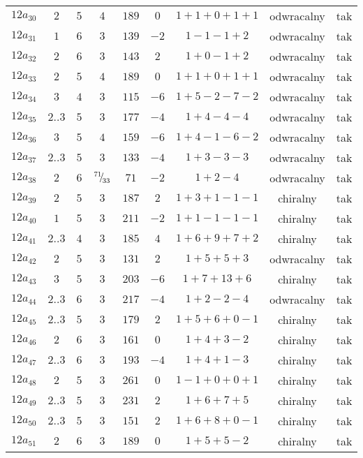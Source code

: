 \begin{longtable}{ccccccccc}
$12a_{30}$ & $2$ & $5$ & $4$ & $189$ & $0$ & $1+1+0+1+1$ & odwracalny & tak \\
$12a_{31}$ & $1$ & $6$ & $3$ & $139$ & $-2$ & $1-1-1+2$ & odwracalny & tak \\
$12a_{32}$ & $2$ & $6$ & $3$ & $143$ & $2$ & $1+0-1+2$ & odwracalny & tak \\
$12a_{33}$ & $2$ & $5$ & $4$ & $189$ & $0$ & $1+1+0+1+1$ & odwracalny & tak \\
$12a_{34}$ & $3$ & $4$ & $3$ & $115$ & $-6$ & $1+5-2-7-2$ & odwracalny & tak \\
$12a_{35}$ & $2..3$ & $5$ & $3$ & $177$ & $-4$ & $1+4-4-4$ & odwracalny & tak \\
$12a_{36}$ & $3$ & $5$ & $4$ & $159$ & $-6$ & $1+4-1-6-2$ & odwracalny & tak \\
$12a_{37}$ & $2..3$ & $5$ & $3$ & $133$ & $-4$ & $1+3-3-3$ & odwracalny & tak \\
$12a_{38}$ & $2$ & $6$ & ${}^{71}{\mskip -5mu/\mskip -3mu}_{33}$ & $71$ & $-2$ & $1+2-4$ & odwracalny & tak \\
$12a_{39}$ & $2$ & $5$ & $3$ & $187$ & $2$ & $1+3+1-1-1$ & chiralny & tak \\
$12a_{40}$ & $1$ & $5$ & $3$ & $211$ & $-2$ & $1+1-1-1-1$ & chiralny & tak \\
$12a_{41}$ & $2..3$ & $4$ & $3$ & $185$ & $4$ & $1+6+9+7+2$ & chiralny & tak \\
$12a_{42}$ & $2$ & $5$ & $3$ & $131$ & $2$ & $1+5+5+3$ & odwracalny & tak \\
$12a_{43}$ & $3$ & $5$ & $3$ & $203$ & $-6$ & $1+7+13+6$ & chiralny & tak \\
$12a_{44}$ & $2..3$ & $6$ & $3$ & $217$ & $-4$ & $1+2-2-4$ & odwracalny & tak \\
$12a_{45}$ & $2..3$ & $5$ & $3$ & $179$ & $2$ & $1+5+6+0-1$ & chiralny & tak \\
$12a_{46}$ & $2$ & $6$ & $3$ & $161$ & $0$ & $1+4+3-2$ & chiralny & tak \\
$12a_{47}$ & $2..3$ & $6$ & $3$ & $193$ & $-4$ & $1+4+1-3$ & chiralny & tak \\
$12a_{48}$ & $2$ & $5$ & $3$ & $261$ & $0$ & $1-1+0+0+1$ & chiralny & tak \\
$12a_{49}$ & $2..3$ & $5$ & $3$ & $231$ & $2$ & $1+6+7+5$ & chiralny & tak \\
$12a_{50}$ & $2..3$ & $5$ & $3$ & $151$ & $2$ & $1+6+8+0-1$ & chiralny & tak \\
$12a_{51}$ & $2$ & $6$ & $3$ & $189$ & $0$ & $1+5+5-2$ & chiralny & tak \\

\end{longtable}
